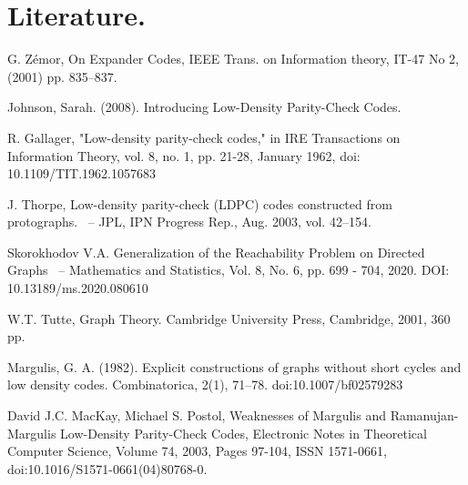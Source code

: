\documentclass[a4paper,fleqn]{cas-sc}
\newcounter{definition}[section]
\begin{document}

\renewcommand{\mod}[1]{\textrm{mod}\ #1}




\section{Literature.}


\begin{thebibliography}{0}

G. Zémor, On Expander Codes, IEEE Trans. on Information theory, IT-47
No 2, (2001) pp. 835–837.
  
Johnson, Sarah. (2008). Introducing Low-Density Parity-Check Codes. 

R. Gallager, "Low-density parity-check codes," in IRE Transactions on Information Theory, vol. 8, no. 1, pp. 21-28, January 1962, doi: 10.1109/TIT.1962.1057683

J. Thorpe,
Low-density parity-check (LDPC) codes constructed from protographs.
~-- JPL, IPN Progress Rep., Aug. 2003, vol. 42–154.

Skorokhodov V.A. Generalization of the Reachability Problem on Directed Graphs
~-- Mathematics and Statistics, Vol. 8, No. 6, pp. 699 - 704, 2020. DOI: 10.13189/ms.2020.080610

W.T. Tutte, Graph Theory. Cambridge University Press, Cambridge, 2001, 360 pp.

Margulis, G. A. (1982). Explicit constructions of graphs without short cycles and low density codes. Combinatorica, 2(1), 71–78. 
doi:10.1007/bf02579283

David J.C. MacKay, Michael S. Postol, Weaknesses of Margulis and Ramanujan-Margulis Low-Density Parity-Check Codes, Electronic Notes in Theoretical Computer Science, Volume 74, 2003, Pages 97-104, ISSN 1571-0661, doi:10.1016/S1571-0661(04)80768-0.


\end{thebibliography}
\end{document}
